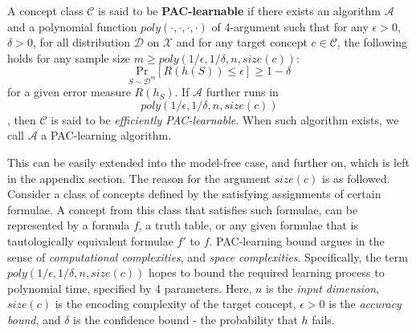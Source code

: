 \documentclass[
  journal=largetwo,
  year=2025,
  volume=37,
]{cup-journal}
\begin{document}
\begin{definition}
    A concept class $\mathcal{C}$ is said to be \textbf{PAC-learnable} if there exists an algorithm $\mathcal{A}$ and a polynomial function $poly(\cdot,\cdot,\cdot,\cdot)$ of 4-argument such that for any $\epsilon>0$, $\delta>0$, for all distribution $\mathcal{D}$ on $\mathcal{X}$ and for any target concept $c\in\mathcal{C}$, the following holds for any sample size $m\geq poly(1/\epsilon,1/\delta,n,size(c))$: $$\underset{S\sim \mathcal{D}^{m}}{\mathrm{Pr}}\left[ R(h(S))\leq \epsilon \right]\geq 1-\delta$$
    for a given error measure $R(h_{S})$. If $\mathcal{A}$ further runs in $$poly(1/\epsilon,1/\delta,n,size(c))$$, then $\mathcal{C}$ is said to be \textit{efficiently PAC-learnable}. When such algorithm exists, we call $\mathcal{A}$ a PAC-learning algorithm. 
\end{definition}
This can be easily extended into the model-free case, and further on, which is left in the appendix section. The reason for the argument $size(c)$ is as followed. Consider a class of concepts defined by the satisfying assignments of certain formulae. A concept from this class that satisfies such formulae, can be represented by a formula $f$, a truth table, or any given formulae that is tautologically equivalent formulae $f'$ to $f$. PAC-learning bound argues in the sense of \textit{computational complexities}, and \textit{space complexities}. Specifically, the term $poly(1/\epsilon,1/\delta,n,size(c))$ hopes to bound the required learning process to polynomial time, specified by 4 parameters. Here, $n$ is the \textit{input dimension}, $size(c)$ is the encoding complexity of the target concept, $\epsilon>0$ is the \textit{accuracy bound}, and $\delta$ is the confidence bound - the probability that $h$ fails.
\end{document}
